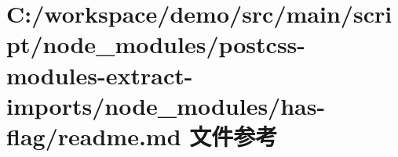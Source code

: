 \hypertarget{node__modules_2postcss-modules-extract-imports_2node__modules_2has-flag_2_r_e_a_d_m_e_8md}{}\section{C\+:/workspace/demo/src/main/script/node\+\_\+modules/postcss-\/modules-\/extract-\/imports/node\+\_\+modules/has-\/flag/readme.md 文件参考}
\label{node__modules_2postcss-modules-extract-imports_2node__modules_2has-flag_2_r_e_a_d_m_e_8md}
